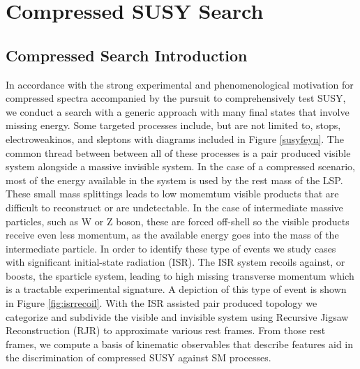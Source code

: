 
\setcounter{secnumdepth}{3}
\setcounter{tocdepth}{3}
\setlength{\parskip}{\smallskipamount}
\setlength{\parindent}{0pt}


\makeatletter


\providecommand{\tabularnewline}{\\}


\makeatother

%

\chapter{Compressed SUSY Search}


\section{Compressed Search Introduction}
In accordance with the strong experimental and phenomenological motivation for compressed spectra accompanied by the pursuit to comprehensively test SUSY, we conduct a search with a generic approach with many final states that involve missing energy. Some targeted processes include, but are not limited to, stops, electroweakinos, and sleptons with diagrams included in Figure \ref{susyfeyn}.  
The common thread between between all of these processes is a pair produced visible system alongside a massive invisible system. In the case of a compressed scenario, most of the energy available in the system is used by the rest mass of the LSP. These small mass splittings leads to low momemtum visible products that are difficult to reconstruct or are undetectable. In the case of intermediate massive particles, such as W or Z boson, these are forced off-shell so the visible products receive even less momentum, as the available energy goes into the mass of the intermediate particle. In order to identify these type of events we study cases with significant initial-state radiation (ISR). The ISR system recoils against, or boosts, the sparticle system, leading to high missing transverse momentum which is a tractable experimental signature. A depiction of this type of event is shown in Figure \ref{fig:isrrecoil}. With the ISR assisted pair produced topology we categorize and subdivide the visible and invisible system using Recursive Jigsaw Reconstruction (RJR) to approximate various rest frames. From those rest frames, we compute a basis of kinematic observables that describe features aid in the discrimination of compressed SUSY against SM processes.

